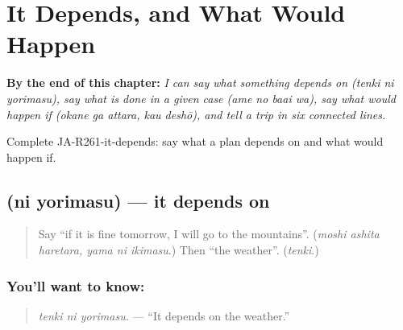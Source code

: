 
\chapter{It Depends, and What Would Happen}
\label{ch:ja-it-depends-and-what-would-happen}

\begin{chapteropening}
\textbf{By the end of this chapter:} \emph{I can say what something depends on (tenki ni yorimasu), say what is done in a given case (ame no baai wa), say what would happen if (okane ga attara, kau deshō), and tell a trip in six connected lines.}

Complete JA-R261-it-depends: say what a plan depends on and what would happen if.
\end{chapteropening}

\section[\texorpdfstring{\ja{〜}\ja{に} \ja{よります} (ni yorimasu)}{〜に よります (ni yorimasu)}]{  (ni yorimasu) — it depends on}

\label{lesson:JA-C261-ni-yorimasu}



\begin{quote}
Say \textquotedblleft{}if it is fine tomorrow, I will go to the mountains\textquotedblright{}. (\emph{moshi ashita haretara, yama ni ikimasu}.) Then \textquotedblleft{}the weather\textquotedblright{}. (\emph{tenki}.)
\end{quote}

\subsection*{You'll want to know:  }
\begin{quote}
\textbf{ }
\end{quote}

\begin{quote}
\emph{tenki ni yorimasu.} — \textquotedblleft{}It depends on the weather.\textquotedblright{}
\end{quote}

